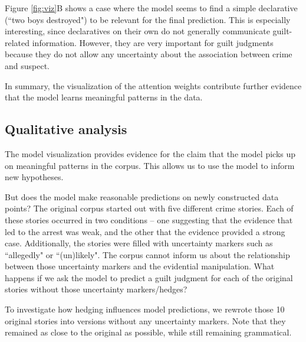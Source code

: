 \documentclass[11pt,a4paper]{article}
\begin{document}
Figure \ref{fig:viz}B shows a case where the model seems to find a simple declarative (``two boys destroyed") to be relevant for the final prediction. This is especially interesting, since declaratives on their own do not generally communicate guilt-related information. However, they are very important for guilt judgments because they do not allow any uncertainty about the association between crime and suspect.

In summary, the visualization of the attention weights contribute further evidence that the model learns meaningful patterns in the data.

\subsection{Qualitative analysis}

The model visualization provides evidence for the claim that the model picks up on meaningful patterns in the corpus. This allows us to use the model to inform new hypotheses.

But does the model make reasonable predictions on newly constructed data points?
The original corpus started out with five different crime stories. Each of these stories occurred in two conditions -- one suggesting that the evidence that led to the arrest was weak, and the other that the evidence provided a strong case. Additionally, the stories were filled with uncertainty markers such as ``allegedly" or ``(un)likely". The corpus cannot inform us about the relationship between those uncertainty markers and the evidential manipulation. What happens if we ask the model to predict a guilt judgment for each of the original stories without those uncertainty markers/hedges?

To investigate how hedging influences model predictions, we rewrote those 10 original stories into versions without any uncertainty markers. Note that they remained as close to the original as possible, while still remaining grammatical.
\end{document}
